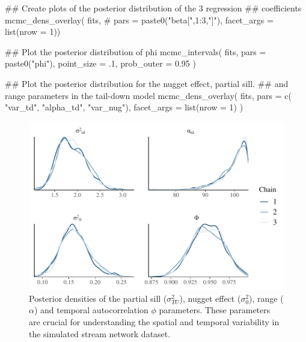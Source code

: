 \begin{example}
## Create plots of the posterior distribution of the 3 regression
## coefficients
mcmc_dens_overlay(
  fits, #
  pars = paste0("beta[",1:3,"]"),
  facet_args = list(nrow = 1))

## Plot the posterior distribution of phi
mcmc_intervals(
  fits,
  pars = paste0("phi"),
  point_size = .1,
  prob_outer = 0.95
)

## Plot the posterior distribution for the nugget effect, partial sill.
## and range parameters in the tail-down model
mcmc_dens_overlay(
  fits,
  pars = c(
    "var_td",
    "alpha_td",
    "var_nug"),
  facet_args = list(nrow = 1)
)
\end{example}


\begin{figure}[htbp]
  \centering
   \includegraphics[width=5.0in]{./Figs/3densities_pars.pdf}
  \caption{Posterior densities of the partial sill ($\sigma^2_{TU}$), nugget effect ($\sigma^2_{0}$), range ($\alpha$) and temporal autocorrelation $\phi$ parameters.
  These parameters are crucial for understanding the spatial and temporal variability in the simulated stream network dataset.
  }
  \label{figure:3densities_pars}
\end{figure}



